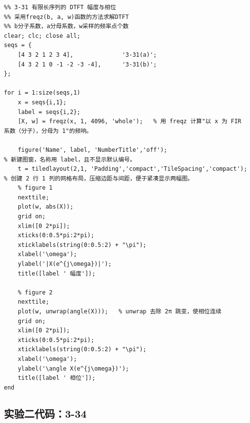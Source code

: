 \documentclass[UTF8,12pt,a4paper]{ctexart}
\begin{document}
\begin{lstlisting}
%% 3-31 有限长序列的 DTFT 幅度与相位
%% 采用freqz(b, a, w)函数的方法求解DTFT
%% b分子系数，a分母系数，w采样的频率点个数
clear; clc; close all;
seqs = {
    [4 3 2 1 2 3 4],              '3-31(a)';
    [4 3 2 1 0 -1 -2 -3 -4],      '3-31(b)';
};

for i = 1:size(seqs,1)
    x = seqs{i,1}; 
    label = seqs{i,2};
    [X, w] = freqz(x, 1, 4096, 'whole');   % 用 freqz 计算"以 x 为 FIR 系数（分子），分母为 1"的频响。

    figure('Name', label, 'NumberTitle','off');                         % 新建图窗，名称用 label，且不显示默认编号。
    t = tiledlayout(2,1, 'Padding','compact','TileSpacing','compact');  % 创建 2 行 1 列的网格布局，压缩边距与间距，便于紧凑显示两幅图。
    % figure 1
    nexttile; 
    plot(w, abs(X)); 
    grid on; 
    xlim([0 2*pi]);
    xticks(0:0.5*pi:2*pi);
    xticklabels(string(0:0.5:2) + "\pi");
    xlabel('\omega'); 
    ylabel('|X(e^{j\omega})|');
    title([label ' 幅度']);

    % figure 2
    nexttile; 
    plot(w, unwrap(angle(X)));   % unwrap 去除 2π 跳变，使相位连续
    grid on; 
    xlim([0 2*pi]);
    xticks(0:0.5*pi:2*pi);
    xticklabels(string(0:0.5:2) + "\pi");
    xlabel('\omega'); 
    ylabel('\angle X(e^{j\omega})'); 
    title([label ' 相位']);
end
\end{lstlisting}

\subsection{实验二代码：3-34}
\end{document}
